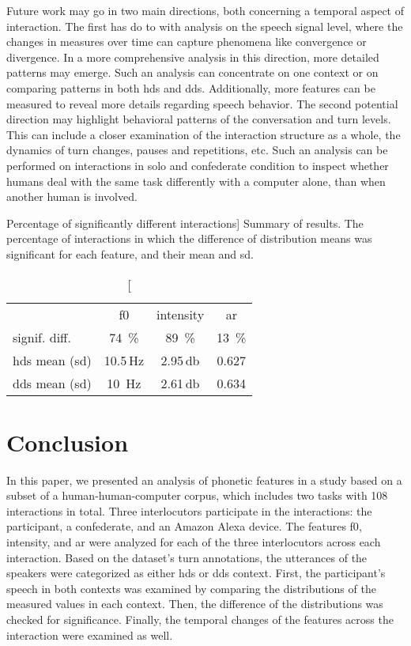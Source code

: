 Future work may go in two main directions, both concerning a temporal aspect of interaction.
The first has do to with analysis on the speech signal level, where the changes in measures over time can capture phenomena like convergence or divergence.
In a more comprehensive analysis in this direction, more detailed patterns may emerge.
Such an analysis can concentrate on one context or on comparing patterns in both \ac{hds} and \ac{dds}.
Additionally, more features can be measured to reveal more details regarding speech behavior.
The second potential direction may highlight behavioral patterns of the conversation and turn levels.
This can include a closer examination of the interaction structure as a whole, the dynamics of turn changes, pauses and repetitions, etc.
Such an analysis can be performed on interactions in solo and confederate condition to inspect whether humans deal with the same task differently with a computer alone, than when another human is involved.

\begin{table}[t]
	\centering
	\caption
		[Percentage of significantly different interactions]
		{Summary of results.
		The percentage of interactions in which the difference of distribution means was significant for each feature, and their mean and \acf{sd}.}
	\label{tab:results_summary}
	\begin{tabular}{lSSS}
		\toprule
		& \acs{f0} 						& {intensity}				& \acs{ar}									\\
		signif. diff.					& \SI{74}{\percent}			& \SI{89}{\percent}		& \SI{13}{\percent} \\
		\acs{hds} mean (\acs{sd}) 		& 10.5\,\si{\hertz}			& 2.95\,\si{\decibel}	& 0.627				\\
		\acs{dds} mean (\acs{sd}) 		& 10   \,\si{\hertz}		& 2.61\,\si{\decibel}	& 0.634				\\
		\bottomrule	
	\end{tabular}
\end{table}

\section{Conclusion}
\label{sec:conclusion}

In this paper, we presented an analysis of phonetic features in a study based on a subset of a human-human-computer corpus, which includes two tasks with 108 interactions in total.
Three interlocutors participate in the interactions: the participant, a confederate, and an Amazon Alexa device.
The features \ac{f0}, intensity, and \ac{ar} were analyzed for each of the three interlocutors across each interaction.
Based on the dataset's turn annotations, the utterances of the speakers were categorized as either \ac{hds} or \ac{dds} context.
First, the participant's speech in both contexts was examined by comparing the distributions of the measured values in each context.
Then, the difference of the distributions was checked for significance.
Finally, the temporal changes of the features across the interaction were examined as well.

